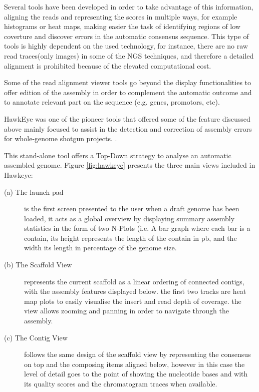 Several tools have been developed in order to take advantage of this information, aligning the reads and representing the scores in multiple ways, for example histograms or heat maps, making easier the task of identifying regions of low coverture and discover errors in the automatic consensus sequence. This type of tools is highly dependent on the used technology, for instance, there are no raw read traces(only images) in some of the NGS techniques, and therefore a detailed alignment is prohibited because of the elevated computational cost.

Some of the read alignment viewer tools go beyond the display functionalities to offer edition of the assembly in order to complement the automatic outcome and to annotate relevant part on the sequence (e.g. genes, promotors, etc).

HawkEye was one of the pioneer tools that offered some of the feature discussed above mainly focused to assist in the detection and correction of assembly errors for whole-genome shotgun projects.  \cite{SCH2007}. 

This stand-alone tool offers a Top-Down strategy to analyse an automatic assembled genome. Figure \ref{fig:hawkeye} presents the three main views included in Hawkeye: 
\begin{description}
\item[(a) The launch pad] is the first screen presented to the user when a draft genome has been loaded, it acts as a global overview by displaying summary assembly statistics in the form of two N-Plots (i.e. A bar graph where each bar is a contain, its height represents the length of the contain in pb, and the width its length in percentage of the genome size.
\item[(b) The Scaffold View] represents the current scaffold as a linear ordering of connected contigs, with the assembly features displayed below. the first two tracks are heat map plots to easily visualise the insert and read depth of coverage. the view allows zooming and panning in order to navigate through the assembly.
\item[(c) The Contig View] follows the same design of the scaffold view by representing the consensus on top and the composing items aligned below, however in this case the level of detail goes to the point of showing the nucleotide bases and with its quality scores and the chromatogram traces when available.
\end{description}

